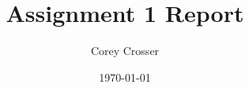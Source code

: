 \documentclass[14pt]{extarticle}
\begin{document}
\title{Assignment 1 Report}
\author{Corey Crosser}
\date{\today}
\maketitle
\end{document}
